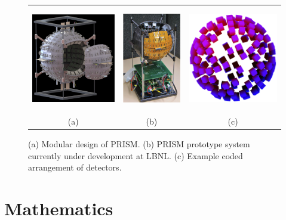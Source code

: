\documentclass[10pt]{article}
\begin{document}

\begin{figure}[htb]
\hypertarget{fig1}{}
\centering
\begin{tabular}{ccc}
	\includegraphics[height=130pt]{Figures/PRISM_Design.png} & 
	\includegraphics[height=130pt]{Figures/PRISM_Prototype.png} & 
	\includegraphics[height=130pt]{Figures/Masked_Configuration.png} \\
	\scriptsize{(a)} & \scriptsize{(b)} & \scriptsize{(c)} \\[-6pt]
\end{tabular}
\caption{(a) Modular design of PRISM. (b) PRISM prototype system currently under development at LBNL. (c) Example coded arrangement of detectors.}
\end{figure}






\section{Mathematics}
\end{document}
